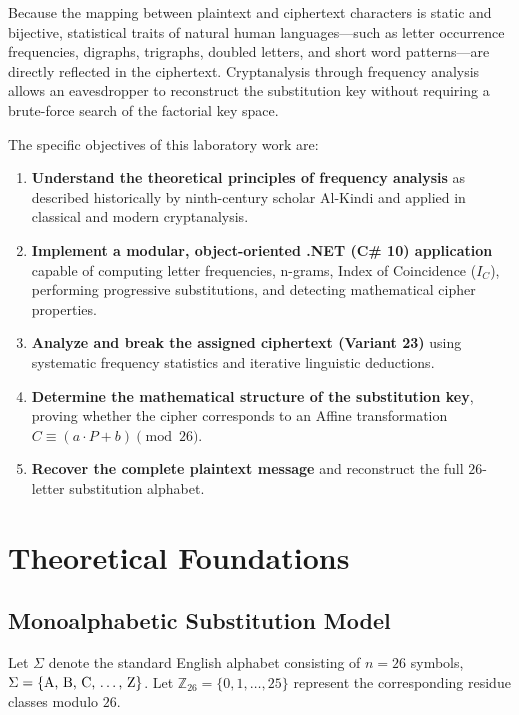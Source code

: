\documentclass[12pt,a4paper]{article}
\begin{document}
Because the mapping between plaintext and ciphertext characters is static and bijective, statistical traits of natural human languages---such as letter occurrence frequencies, digraphs, trigraphs, doubled letters, and short word patterns---are directly reflected in the ciphertext. Cryptanalysis through frequency analysis allows an eavesdropper to reconstruct the substitution key without requiring a brute-force search of the factorial key space.

The specific objectives of this laboratory work are:
\begin{enumerate}
    \item \textbf{Understand the theoretical principles of frequency analysis} as described historically by ninth-century scholar Al-Kindi and applied in classical and modern cryptanalysis.
    \item \textbf{Implement a modular, object-oriented .NET (C\# 10) application} capable of computing letter frequencies, n-grams, Index of Coincidence ($I_C$), performing progressive substitutions, and detecting mathematical cipher properties.
    \item \textbf{Analyze and break the assigned ciphertext (Variant 23)} using systematic frequency statistics and iterative linguistic deductions.
    \item \textbf{Determine the mathematical structure of the substitution key}, proving whether the cipher corresponds to an Affine transformation $C \equiv (a \cdot P + b) \pmod{26}$.
    \item \textbf{Recover the complete plaintext message} and reconstruct the full $26$-letter substitution alphabet.
\end{enumerate}

\section{Theoretical Foundations}

\subsection{Monoalphabetic Substitution Model}
Let $\Sigma$ denote the standard English alphabet consisting of $n = 26$ symbols, $\Sigma = \{\text{A, B, C, \dots, Z}\}$. Let $\mathbb{Z}_{26} = \{0, 1, \dots, 25\}$ represent the corresponding residue classes modulo $26$.
\end{document}

